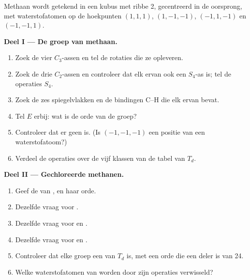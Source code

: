 \begin{problem}
\label{pb:b3:point-groups:1}
Methaan wordt getekend in een kubus met ribbe 2, gecentreerd in de
oorsprong, met waterstofatomen op de hoekpunten $(1,1,1)$, $(1,-1,-1)$, $(-1,1,-1)$ en $(-1,-1,1)$.

\medskip\noindent\textbf{Deel I --- De groep van methaan.}
\begin{enumerate}
  \item Zoek de vier $C_3$-assen en tel de rotaties die ze opleveren.
  \item Zoek de drie $C_2$-assen en controleer dat elk ervan ook een
        $S_4$-as is; tel de operaties $S_4$.
  \item Zoek de zes spiegelvlakken en de bindingen C--H die elk ervan bevat.
  \item Tel $E$ erbij: wat is de orde van de groep?
  \item Controleer dat er geen  is. (Is $(-1,-1,-1)$ een
        positie van een waterstofatoom?)
  \item Verdeel de operaties over de vijf klassen van de tabel van $T_d$.
\end{enumerate}

\medskip\noindent\textbf{Deel II --- Gechloreerde methanen.}
\begin{enumerate}[resume]
  \item Geef de  van , en haar orde.
  \item Dezelfde vraag voor .
  \item Dezelfde vraag voor  en .
  \item Dezelfde vraag voor  en .
  \item Controleer dat elke groep een  van $T_d$ is, met een orde
        die een deler is van 24.
  \item Welke waterstofatomen van  worden door zijn operaties
        verwisseld?
\end{enumerate}


\end{problem}
